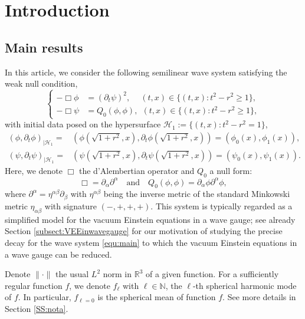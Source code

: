 \documentclass[a4paper,reqno]{amsart}
\theoremstyle{definition}
\numberwithin{equation}{section}
\def \pt{\partial_{t}}
\def\lab{\label}
\begin{document}
 \section{Introduction}
 \subsection{Main results}
 In this article, we consider the following semilinear wave system satisfying the weak null condition,
 \begin{equation}\label{equ:main}
    \left\{
    \begin{aligned}
        -\Box \phi&=\left(\pt \psi\right)^{2},\quad \ (t, x)\in \{ (t,x):t^2 -r^2 \geq 1 \},
        \\
        -\Box \psi&=Q_{0}(\phi,\phi),\ \  (t, x)\in \{ (t,x):t^2 -r^2 \geq 1 \},
    \end{aligned}\right.
 \end{equation}
with initial data posed on the hypersurface $\mathcal{H}_1 := \{(t,x): t^2-r^2 =1 \}$,
 \begin{equation}\label{eq:ID}
 \begin{aligned}
 (\phi, \partial_t\phi)_{|\mathcal{H}_1} 
 =&(\phi(\sqrt{1+r^2}, x), \partial_t\phi(\sqrt{1+r^2}, x))
 = (\phi_0(x), \phi_1(x)),
 \\
  (\psi, \partial_t\psi)_{|\mathcal{H}_1} 
   =&(\psi(\sqrt{1+r^2}, x), \partial_t\psi(\sqrt{1+r^2}, x))
   = (\psi_0(x), \psi_1(x)).
 \end{aligned}
 \end{equation}
 Here, we denote $\Box$ the d’Alembertian operator 
 and $Q_{0}$ a null form:
 \begin{equation}
\lab{def:waveoperatorandQ0}
\Box=\partial_{\alpha}\partial^{\alpha}\quad \mbox{and}\quad Q_{0}(\phi,\phi)=\partial_{\alpha}\phi\partial^{\alpha}\phi,
 \end{equation}
 {where $\partial^{\alpha}=\eta^{\alpha\beta}\partial_{\beta}$ with $\eta^{\alpha\beta}$ being the inverse metric of the standard Minkowski metric $\eta_{\alpha\beta}$ with signature $(-,+,+,+)$.}
 This system is typically regarded as a simplified model for the vacuum Einstein equations in a wave gauge; see already Section \ref{subsect:VEEinwavegauge} for our motivation of studying the precise decay for the wave system \eqref{equ:main} to which the vacuum Einstein equations in a wave gauge can be reduced.

Denote $\| \cdot\|$ the usual $L^2$ norm in $\mathbb{R}^3$
of a given function. For a sufficiently regular function $f$, we denote $f_{\ell}$ with $\ell\in \mathbb{N}$, the $\ell$-th spherical harmonic mode of $f$. In particular, $f_{\ell=0}$ is the spherical mean of function $f$. See more details in Section \ref{SS:nota}.
\end{document}
